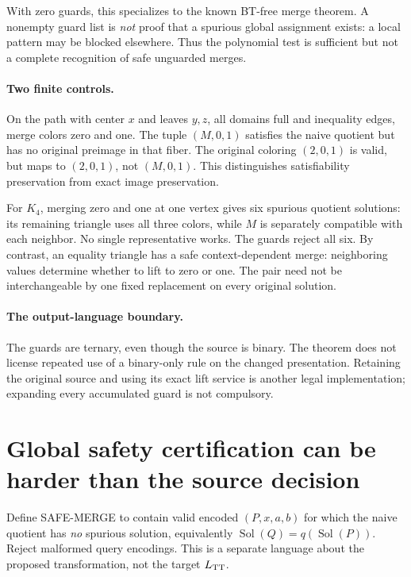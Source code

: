 \documentclass[11pt]{article}
\newcommand{\Sol}{\operatorname{Sol}}
\begin{document}
With zero guards, this specializes to the known BT-free merge theorem.
A nonempty guard list is \emph{not} proof that a spurious global assignment
exists: a local pattern may be blocked elsewhere. Thus the polynomial test
is sufficient but not a complete recognition of safe unguarded merges.

\paragraph{Two finite controls.}
On the path with center $x$ and leaves $y,z$, all domains full and inequality
edges, merge colors zero and one. The tuple $(M,0,1)$ satisfies the naive
quotient but has no original preimage in that fiber. The original coloring
$(2,0,1)$ is valid, but maps to $(2,0,1)$, not $(M,0,1)$. This distinguishes
satisfiability preservation from exact image preservation.

For $K_4$, merging zero and one at one vertex gives six spurious quotient
solutions: its remaining triangle uses all three colors, while $M$ is
separately compatible with each neighbor. No single representative works.
The guards reject all six. By contrast, an equality triangle has a safe
context-dependent merge: neighboring values determine whether to lift to
zero or one. The pair need not be interchangeable by one fixed replacement
on every original solution.

\paragraph{The output-language boundary.}
The guards are ternary, even though the source is binary. The theorem does
not license repeated use of a binary-only rule on the changed presentation.
Retaining the original source and using its exact lift service is another
legal implementation; expanding every accumulated guard is not compulsory.

\section{Global safety certification can be harder than the source decision}
Define SAFE-MERGE to contain valid encoded $(P,x,a,b)$ for which the naive
quotient has \emph{no} spurious solution, equivalently
$\Sol(Q)=q(\Sol(P))$. Reject malformed query encodings. This is a separate
language about the proposed transformation, not the target $L_{\rm TT}$.
\end{document}

